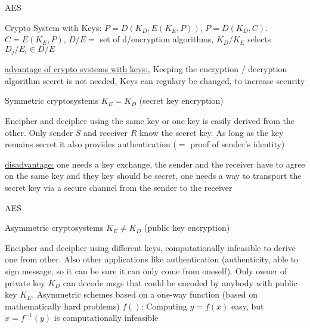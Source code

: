 \documentclass[landscape, a4paper]{article}
\begin{document}
\begin{minipage}[t]{0.2\linewidth}
\begin{betterlist}
\begin{betterlist}
			\item \alert{AES}
		\end{betterlist}
	\end{betterlist}
	\begin{betterlist}
		\item \alert{Crypto System with Keys:} $P = D(K_D, E(K_E, P))$, $P = D(K_D, C)$. $C = E(K_E, P)$, $D/E =$ set of d/encryption algorithms, $K_D/K_E$ selects $D_j/E_i \in D/E$
		\begin{betterlist}
			\item \underline{advantage of crypto systems with keys:}, Keeping the encryption / decryption algorithm secret is not needed, Keys can regulary be changed, to increase security
		\end{betterlist}
	\end{betterlist}
	\begin{betterlist}
		\item \alert{Symmetric cryptosystems} $K_E = K_D$ (secret key encryption)
		\begin{betterlist}
			\item Encipher and decipher using the same key or one key is easily derived from the other. Only sender $S$ and receiver $R$ know the \alert{secret key}. As long as the key remains secret it also provides \alert{authentication} ($=$ proof of sender’s identity)
			\item \underline{disadvantage:} one needs a \alert{key exchange}, the sender and the receiver have to agree on the same key and they key should be secret, one needs a way to transport the secret key via a secure channel from the sender to the receiver
			\item \alert{AES}
		\end{betterlist}
	\end{betterlist}
	\begin{betterlist}
		\item \alert{Asymmetric cryptosystems} $K_E \ne K_D$ (public key encryption)
		\begin{betterlist}
			\item Encipher and decipher using different keys, computationally infeasible to derive one from other. Also other applications like \alert{authentication} (authenticity, able to sign message, so it can be sure it can only come from oneself). Only owner of \alert{private key} $K_D$ can decode msgs that could be encoded by anybody with \alert{public key} $K_E$. Asymmetric schemes based on a \alert{one-way function} (based on mathematically hard problems) $f()$: Computing $y = f(x)$ easy, but $x = f^{-1}(y)$ is computationally infeasible

\end{betterlist}
\end{betterlist}
\end{minipage}
\end{document}
